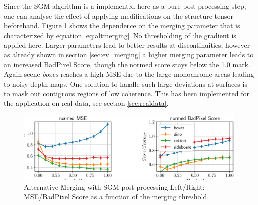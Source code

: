 \documentclass  [
  paper    = a4,
  BCOR     = 10mm,
  twoside,
  fontsize = 12pt,
  fleqn,
  toc      = bibnumbered,
  toc      = listofnumbered,
  numbers  = noendperiod,
  headings = normal,
  listof   = leveldown,
  version  = 3.03
]                                       {scrreprt}
\begin{document}
Since the SGM algorithm is a implemented here as a pure post-processing step, one can analyse the effect of applying modifications on the structure tensor beforehand. Figure \ref{fig:chooselowersgmppr} shows the dependence on the merging parameter that is characterized by equation \ref{eq:altmerging}. No thresholding of the gradient is applied here. Larger parameters lead to better results at discontinuities, however as already shown in section \ref{sec:ev_merging} a higher merging parameter leads to an increased BadPixel Score, though the normed score stays below the 1.0 mark. Again scene \textit{boxes} reaches a high MSE due to the large monochrome areas leading to noisy depth maps. One solution to handle such large deviations at surfaces is to mask out contiguous regions of low coherence. This has been implemented for the application on real data, see section \ref{sec:realdata}.\\
\begin{figure}
	\centering
	\includegraphics[width=1\linewidth]{images/choose_lower_sgm_ppr}
	\caption[Alternative Merging with SGM post-processing]{Alternative Merging with SGM post-processing Left/Right: MSE/BadPixel Score as a function of the merging threshold.}
	\label{fig:chooselowersgmppr}
\end{figure}
\end{document}
